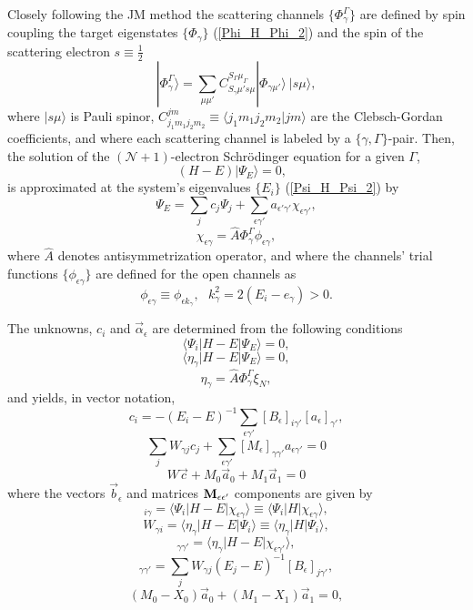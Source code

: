 \documentclass[aip
, pra
, showpacs
, aps
, twocolumn
, groupedaddress
, floatfix
]{revtex4}
\newcommand{\beq}{\begin{equation}}
\newcommand{\eeq}{\end{equation}}
\begin{document}
Closely following the JM method \cite{BR76p1491, KFB11} the scattering channels $\{\Phi_\gamma^\Gamma\}$ are defined by spin coupling the target eigenstates
$\{\Phi_\gamma\}$ (\ref{Phi_H_Phi_2})
and the spin of the scattering electron
$s\equiv \frac{1}{2}$
\beq
| \Phi_{\gamma}^{\Gamma} \rangle = \sum_{\mu \mu'}
C_{S_\gamma \mu' s \mu}^{S_\Gamma \mu_\Gamma}
|\Phi_{\gamma \mu'} \rangle \ |s \mu  \rangle,
\label{chi_phi_Gamma} \eeq
where $|s \mu \rangle$ is Pauli spinor,
$C_{j_1m_1j_2m_2}^{jm} \equiv \langle j_1m_1 j_2 m_2| jm\rangle$ are the Clebsch-Gordan coefficients,
and where each scattering channel is labeled by a $\{\gamma, \Gamma\}$-pair.
Then, the solution of the $(\mathcal{N}+1)$-electron Schr\"odinger equation for a given $\Gamma$,
\beq
(H-E) | \Psi_E \rangle =0,  \ \ \  \label{H_E_Psi_E_2}
\eeq
is approximated at the system's eigenvalues $\{E_i\}$ (\ref{Psi_H_Psi_2}) by
\beq
 \Psi_{E}  =  \sum_j c_j \Psi_j
+ \sum_{\epsilon \gamma'}   a_{\epsilon' \gamma'}
\chi_{\epsilon \gamma'} ,
\eeq
\beq
\chi_{\epsilon \gamma} = \hat{A} \Phi^\Gamma_{\gamma}  \phi_{\epsilon \gamma},
\eeq
where $\hat{A}$ denotes antisymmetrization operator,
and where the channels' trial functions $\{ \phi_{\epsilon \gamma} \}$ are defined for the open channels as
\beq
\phi_{\epsilon \gamma}\equiv \phi_{\epsilon k_\gamma}, \ \ \   k_{\gamma}^2 = 2(E_i - e_\gamma) > 0.
\eeq


The unknowns, $c_i$ and $\vec{\alpha}_\epsilon$ are determined from the following conditions
\beq
\langle \Psi_i|H-E|\Psi_{E}\rangle=0,
\label{EES_MC_C1} \eeq  %
\beq
\langle \eta_\gamma |H-E|\Psi_{E}\rangle=0,
\label{EES_MC_C2} \eeq  %
\beq
\eta_{\gamma} = \hat{A} \Phi^\Gamma_{\gamma}  \xi_{N},
\eeq
and yields, in vector notation,
\beq
c_i = - (E_i-E)^{-1} \sum_{\epsilon \gamma'}  [B_{\epsilon}]_{i \gamma'} [a_{\epsilon}]_{\gamma'},
\eeq
\beq
\sum_j W_{\gamma j} c_j +  \sum_{\epsilon \gamma'}  [M_{\epsilon}]_{\gamma \gamma'} a_{\epsilon \gamma'} = 0
\eeq
\beq
W \vec{c} +  M_{0} \vec{a}_0+ M_{1} \vec{a}_1 = 0
\eeq
where the vectors $\vec{b}_\epsilon$ and matrices ${\bf M}_{\epsilon\epsilon'}$ components are given by
\beq
[B_{\epsilon}]_{i \gamma}
= \langle \Psi_i |H-E| \chi_{\epsilon \gamma} \rangle
\equiv \langle \Psi_i |H| \chi_{\epsilon \gamma} \rangle,
\eeq
\beq
W_{\gamma i}
= \langle \eta_\gamma |H-E| \Psi_i \rangle
\equiv \langle \eta_\gamma |H| \Psi_i \rangle,
\eeq
\beq
[M_{\epsilon}]_{\gamma \gamma'} = \langle \eta_{\gamma}  | H-E |
\chi_{\epsilon \gamma'} \rangle,
\label{Y_B_W} \eeq
\beq
[X_\epsilon]_{\gamma \gamma'} = \sum_{j}  W_{\gamma j} (E_j-E)^{-1}  [B_{\epsilon}]_{ j \gamma'},
\eeq
\beq
(M_{0} - X_{0} )\vec{a}_0+ (M_{1} - X_{1} )\vec{a}_1=0,
\eeq
\end{document}
